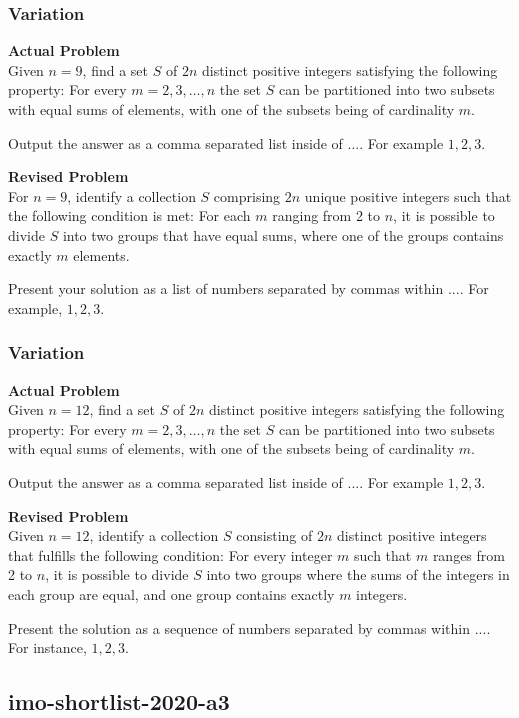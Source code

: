 \subsubsection{Variation}
\textbf{Actual Problem}\\
Given $n = 9$, find a set $S$ of $2n$ distinct positive integers
satisfying the following property: For every $m = 2, 3, \ldots, n$ the set $S$ can be partitioned into
two subsets with equal sums of elements, with one of the subsets being of cardinality $m$.

Output the answer as a comma separated list inside of $\boxed{...}$. For example $\boxed{1, 2, 3}$.

\textbf{Revised Problem}\\
For $n = 9$, identify a collection $S$ comprising $2n$ unique positive integers such that the following condition is met: For each $m$ ranging from 2 to $n$, it is possible to divide $S$ into two groups that have equal sums, where one of the groups contains exactly $m$ elements.

Present your solution as a list of numbers separated by commas within $\boxed{...}$. For example, $\boxed{1, 2, 3}$.

\subsubsection{Variation}
\textbf{Actual Problem}\\
Given $n = 12$, find a set $S$ of $2n$ distinct positive integers
satisfying the following property: For every $m = 2, 3, \ldots, n$ the set $S$ can be partitioned into
two subsets with equal sums of elements, with one of the subsets being of cardinality $m$.

Output the answer as a comma separated list inside of $\boxed{...}$. For example $\boxed{1, 2, 3}$.

\textbf{Revised Problem}\\
Given $n = 12$, identify a collection $S$ consisting of $2n$ distinct positive integers that fulfills the following condition: For every integer $m$ such that $m$ ranges from 2 to $n$, it is possible to divide $S$ into two groups where the sums of the integers in each group are equal, and one group contains exactly $m$ integers.

Present the solution as a sequence of numbers separated by commas within $\boxed{...}$. For instance, $\boxed{1, 2, 3}$.

\subsection{imo-shortlist-2020-a3}
